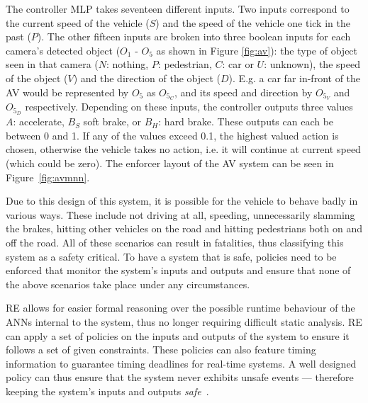 The controller \ac{MLP} takes seventeen different inputs. 
Two inputs correspond to the current speed of the vehicle ($S$) and the speed of the vehicle one tick in the past ($P$). 
The other fifteen inputs are broken into three boolean inputs for each camera's detected object ($O_1$ - $O_5$ as shown in Figure \ref{fig:av}): the type of object seen in that camera ($N$: nothing, $P$: pedestrian, $C$: car or $U$: unknown), the speed of the object ($V$) and the direction of the object ($D$).
E.g. a car far in-front of the \ac{AV} would be represented by $O_5$ as $O_{5_C}$, and its speed and direction by $O_{5_V}$ and $O_{5_D}$ respectively.
Depending on these inputs, the controller outputs three values  $A$: accelerate, $B_S$ soft brake, or $B_H$: hard brake.
These outputs can each be between 0 and 1.
If any of the values exceed 0.1, the highest valued action is chosen, otherwise the vehicle takes no action, i.e. it will continue at current speed (which could be zero).
The enforcer layout of the \ac{AV} system can be seen in Figure~\ref{fig:avmnn}.

Due to this design of this system, it is possible for the vehicle to behave badly in various ways. 
These include not driving at all, speeding, unnecessarily slamming the brakes, hitting other vehicles on the road and hitting pedestrians both on and off the road.
All of these scenarios can result in fatalities, thus classifying this system as a safety critical.
To have a system that is safe, policies need to be enforced that monitor the system's inputs and outputs and ensure that none of the above scenarios take place under any circumstances.



\ac{RE} allows for easier formal reasoning over the possible runtime behaviour of the \acp{ANN} internal to the system, thus no longer requiring difficult static analysis.
\ac{RE} can apply a set of policies on the inputs and outputs of the system to ensure it follows a set of given constraints. %
These policies can also feature timing information to guarantee timing deadlines for real-time systems.
A well designed policy can thus ensure that the system never exhibits unsafe events --- therefore keeping the system's inputs and outputs \textit{safe}~\cite{EstSafeCriteria2003}. 









